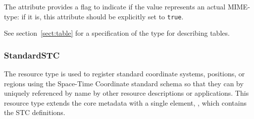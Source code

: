 \documentclass[11pt,a4paper]{ivoa}
\begin{document}


The  attribute
provides a flag to indicate if the value represents an actual
MIME-type: if it is, this attribute should be explicitly set to
\texttt{true}.




See section~\ref{sect:table} for a specification of
the  type for describing tables.  


\subsubsection{StandardSTC}
\label{sect:standardstc}


The  resource type is used to register standard
coordinate systems, positions, or regions using the Space-Time
Coordinate standard schema \citep{2007ivoa.spec.1030R} so that
they can by uniquely referenced by name by other resource descriptions
or applications.  This resource type extends the core metadata with a
single element, , which contains
the STC definitions.  
\end{document}
